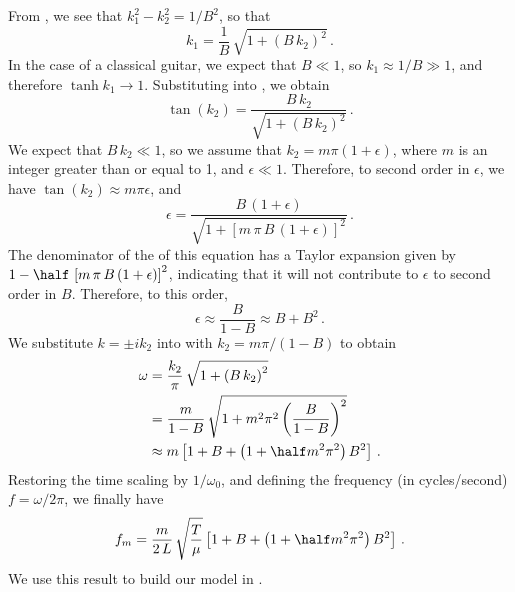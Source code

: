From , we see that $k_1^2 - k_2^2 = 1/B^2$, so that
 \begin{equation} \label{eqn:k1k2}
k_1 = \frac{1}{B}\, \sqrt{1 + \left(B\, k_2\right)^2}\, .
 \end{equation}
In the case of a classical guitar, we expect that $B \ll 1$, so $k_1 \approx 1/B \gg 1$, and therefore $\tanh{k_1} \longrightarrow 1$. Substituting  into , we obtain
 \begin{equation} \label{eqn:tran_eqn_2}
\tan(k_2) = \frac{B\, k_2}{ \sqrt{1 + \left(B\, k_2\right)^2}}\, .
 \end{equation}
We expect that $B\, k_2 \ll 1$, so we assume that $k_2 = m \pi (1 + \epsilon)$, where $m$ is an integer greater than or equal to 1, and $\epsilon \ll 1$. Therefore, to second order in $\epsilon$, we have $\tan(k_2) \approx m \pi \epsilon$, and
 \begin{equation}
\epsilon = \frac{B\, (1 + \epsilon)}{\sqrt{1 + \left[m\, \pi\, B\, (1 + \epsilon)\right]^2}}\, .
 \end{equation}
The denominator of the \rhs of this equation has a Taylor expansion given by $1 - \half\, \left[m\, \pi\, B\, (1 + \epsilon)\right]^2$, indicating that it will not contribute to $\epsilon$ to second order in $B$. Therefore, to this order,
 \begin{equation}%
\epsilon \approx \frac{B}{1 - B} \approx B + B^2\, .
 \end{equation}
We substitute $k = \pm i k_2$ into  with $k_2 = m \pi/(1 - B)$ to obtain
 \begin{equation}
 \begin{split}
\omega &= \frac{k_2}{\pi}\, \sqrt{1 + \left(B\, k_2\right)^2} \\
&= \frac{m}{1 - B}\, \sqrt{1 + m^2 \pi^2 \left(\frac{B}{1 - B}\right)^2} \\
&\approx m \left[ 1 + B + \left( 1 + \half m^2 \pi^2 \right) B^2 \right]\, .
 \end{split}
 \end{equation}
Restoring the time scaling by $1/\omega_0$, and defining the frequency (in cycles/second) $f = \omega/2 \pi$, we finally have
 \begin{equation} \label{eqn:f_m_hybrid}
f_m = \frac{m}{2\, L}\, \sqrt{\frac{T}{\mu}} \left[ 1 + B + \left( 1 + \half m^2 \pi^2 \right) B^2 \right]\, .
 \end{equation}
We use this result to build our model in . 